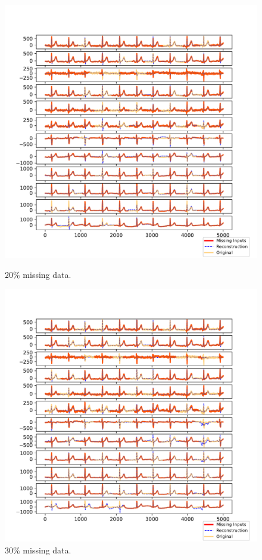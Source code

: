 \documentclass{mldsmsc}
\begin{document}
\begin{figure}[H]
\centering
\begin{minipage}{0.4\linewidth}
    \centering
    \includegraphics[width=\linewidth]{images/missing/rpsmf_output_20_3.pdf}
    \caption{$20\%$ missing data.}
\end{minipage}%
\hspace{0.05\linewidth}
\begin{minipage}{0.4\linewidth}
    \centering
    \includegraphics[width=\linewidth]{images/missing/rpsmf_output_30_3.pdf}
    \caption{$30\%$ missing data.}
\end{minipage}


\end{figure}
\end{document}
